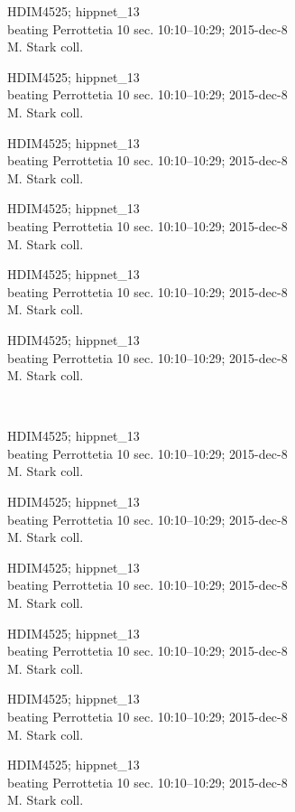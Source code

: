 \documentclass[2pt]{extarticle}
\begin{document}
\noindent
\parbox{0.16\textwidth}{\tiny \raggedright \rule[-0.3\baselineskip]{0pt}{10pt}HDIM4525; hippnet\_13\\ beating Perrottetia 10 sec. 10:10--10:29; 2015-dec-8\\ M. Stark coll.}
\parbox{0.16\textwidth}{\tiny \raggedright \rule[-0.3\baselineskip]{0pt}{10pt}HDIM4525; hippnet\_13\\ beating Perrottetia 10 sec. 10:10--10:29; 2015-dec-8\\ M. Stark coll.}
\parbox{0.16\textwidth}{\tiny \raggedright \rule[-0.3\baselineskip]{0pt}{10pt}HDIM4525; hippnet\_13\\ beating Perrottetia 10 sec. 10:10--10:29; 2015-dec-8\\ M. Stark coll.}
\parbox{0.16\textwidth}{\tiny \raggedright \rule[-0.3\baselineskip]{0pt}{10pt}HDIM4525; hippnet\_13\\ beating Perrottetia 10 sec. 10:10--10:29; 2015-dec-8\\ M. Stark coll.}
\parbox{0.16\textwidth}{\tiny \raggedright \rule[-0.3\baselineskip]{0pt}{10pt}HDIM4525; hippnet\_13\\ beating Perrottetia 10 sec. 10:10--10:29; 2015-dec-8\\ M. Stark coll.}
\parbox{0.16\textwidth}{\tiny \raggedright \rule[-0.3\baselineskip]{0pt}{10pt}HDIM4525; hippnet\_13\\ beating Perrottetia 10 sec. 10:10--10:29; 2015-dec-8\\ M. Stark coll.} \\ 
\vspace{0.001in} 

\noindent
\parbox{0.16\textwidth}{\tiny \raggedright \rule[-0.3\baselineskip]{0pt}{10pt}HDIM4525; hippnet\_13\\ beating Perrottetia 10 sec. 10:10--10:29; 2015-dec-8\\ M. Stark coll.}
\parbox{0.16\textwidth}{\tiny \raggedright \rule[-0.3\baselineskip]{0pt}{10pt}HDIM4525; hippnet\_13\\ beating Perrottetia 10 sec. 10:10--10:29; 2015-dec-8\\ M. Stark coll.}
\parbox{0.16\textwidth}{\tiny \raggedright \rule[-0.3\baselineskip]{0pt}{10pt}HDIM4525; hippnet\_13\\ beating Perrottetia 10 sec. 10:10--10:29; 2015-dec-8\\ M. Stark coll.}
\parbox{0.16\textwidth}{\tiny \raggedright \rule[-0.3\baselineskip]{0pt}{10pt}HDIM4525; hippnet\_13\\ beating Perrottetia 10 sec. 10:10--10:29; 2015-dec-8\\ M. Stark coll.}
\parbox{0.16\textwidth}{\tiny \raggedright \rule[-0.3\baselineskip]{0pt}{10pt}HDIM4525; hippnet\_13\\ beating Perrottetia 10 sec. 10:10--10:29; 2015-dec-8\\ M. Stark coll.}
\parbox{0.16\textwidth}{\tiny \raggedright \rule[-0.3\baselineskip]{0pt}{10pt}HDIM4525; hippnet\_13\\ beating Perrottetia 10 sec. 10:10--10:29; 2015-dec-8\\ M. Stark coll.} \\ 
\vspace{0.001in} 
\end{document}
